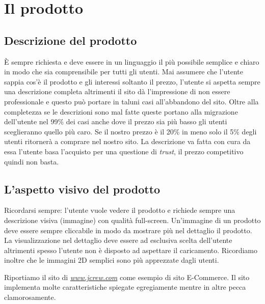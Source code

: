 	\section{Il prodotto}
	
		\subsection{Descrizione del prodotto}
			È sempre richiesta e deve essere in un linguaggio il più possibile semplice e chiaro in modo che sia comprensibile per tutti gli utenti. Mai assumere che l'utente sappia cos'è il prodotto e gli interessi soltanto il prezzo, l'utente si aspetta sempre una descrizione completa altrimenti il sito dà l'impressione di non essere professionale e questo può portare in taluni casi all'abbandono del sito.
			Oltre alla completezza se le descrizioni sono mal fatte queste portano alla migrazione dell'utente nel 99\% dei casi anche dove il prezzo sia più basso gli utenti sceglieranno quello più caro. Se il nostro prezzo è il 20\% in meno solo il 5\% degli utenti ritornerà a comprare nel nostro sito. La descrizione va fatta con cura da essa l'utente basa l'acquisto per una questione di \emph{trust}, il prezzo competitivo quindi non basta.
		
		\subsection{L'aspetto visivo del prodotto}
			Ricordarsi sempre: l'utente vuole vedere il prodotto e richiede sempre una descrizione visiva (immagine) con qualità full-screen. Un'immagine di un prodotto deve essere sempre cliccabile in modo da mostrare più nel dettaglio il prodotto. La visualizzazione nel dettaglio deve essere ad esclusiva scelta dell'utente altrimenti spesso l'utente non è disposto ad aspettare il caricamento. Ricordiamo inoltre che le immagini 2D semplici sono più apprezzate dagli utenti.
		
			Riportiamo il sito di \href{https://www.jcrew.com/it/womens_category/sunglasses.jsp?intcmp=h1_sunglasses}{\emph{www.jcrew.com}} come esempio di sito E-Commerce. Il sito implementa molte caratteristiche spiegate egregiamente mentre in altre pecca clamorosamente.